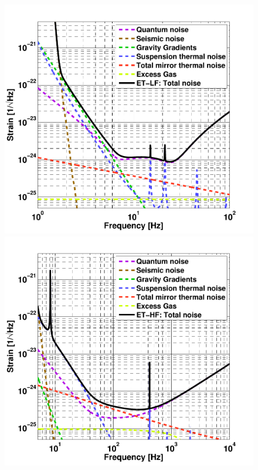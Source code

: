 \begin{figure}
  \begin{center}
  \begin{minipage}[b]{0.6\textwidth}
    \includegraphics[width=\textwidth]{Intro/Intro_Figures/ETD_LF3.pdf}
  \end{minipage}
  \end{center}
\vspace{1cm}
   \begin{center}
  \begin{minipage}[b]{0.6\textwidth}
    \includegraphics[width=\textwidth]{Intro/Intro_Figures/ETD_HF3.pdf}

\end{minipage}
\end{center}
\end{figure}
